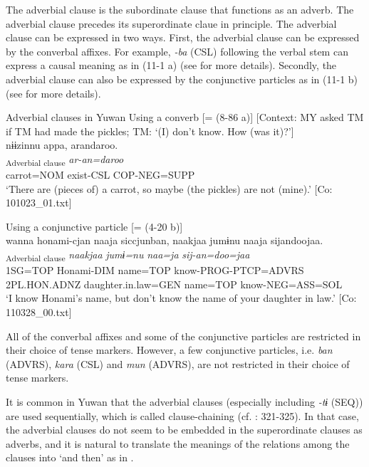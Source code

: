 The adverbial clause is the subordinate clause that functions as an adverb. The adverbial clause precedes its superordinate claue in principle. The adverbial clause can be expressed in two ways. First, the adverbial clause can be expressed by the converbal affixes. For example, \textit{{}-ba} (CSL) following the verbal stem can express a causal meaning as in (11-1 a) (see  for more details). Secondly, the adverbial clause can also be expressed by the conjunctive particles as in (11-1 b) (see  for more details).

\ea\label{ex:11-1}  Adverbial clauses in Yuwan
  \ea Using a converb [= (8-86 a)] [Context: MY asked TM if TM had made the pickles; TM: ‘(I) don’t know. How (was it)?’]\\
  \glll nɨɨzinnu  appa,  arandaroo.\\
    [\textit{nɨɨzin=nu}  \textit{ar-ba}]\textsubscript{Adverbial clause}  \textit{ar-an=daroo}\\
    carrot=NOM  exist-CSL  COP-NEG=SUPP\\
    \glt ‘There are (pieces of) a carrot, so maybe (the pickles) are not (mine).’ [Co: 101023\_01.txt]

  \ex Using a conjunctive particle [= (4-20 b)]\\
   \glll wanna  honami-{\textbar}cjan{\textbar}  naaja  siccjunban, naakjaa  jumɨnu  naaja  sijandoojaa.\\
    [\textit{wan=ja}  \textit{honami-cjan}  \textit{naa=ja}  \textit{sij-tur-n=ban}]\textsubscript{Adverbial clause} \textit{naakjaa}  \textit{jumɨ=nu}  \textit{naa=ja}  \textit{sij-an=doo=jaa}\\
    1SG=TOP  Honami-DIM  name=TOP  know-PROG-PTCP=ADVRS 2PL.HON.ADNZ  daughter.in.law=GEN  name=TOP  know-NEG=ASS=SOL\\
    \glt ‘I know Honami’s name, but don’t know the name of your daughter in law.’ [Co: 110328\_00.txt]
\z
\z

All of the converbal affixes and some of the conjunctive particles are restricted in their choice of tense markers. However, a few conjunctive particles, i.e. \textit{ban} (ADVRS), \textit{kara} (CSL) and \textit{mun} (ADVRS), are not restricted in their choice of tense markers.

It is common in Yuwan that the adverbial clauses (especially including \textit{{}-tɨ} (SEQ)) are used sequentially, which is called clause-chaining (cf. \citealt{Payne1997}: 321-325). In that case, the adverbial clauses do not seem to be embedded in the superordinate clauses as adverbs, and it is natural to translate the meanings of the relations among the clauses into ‘and then’ as in .

